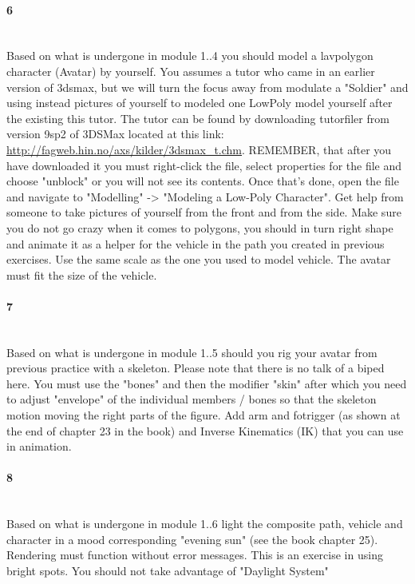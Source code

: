 \paragraph{ 6} ~\\
Based on what is undergone in module 1..4 you should model a lavpolygon character (Avatar) by yourself. 
You assumes a tutor who came in an earlier version of 3dsmax, but we will turn the focus away from modulate a "Soldier" and using instead pictures of yourself 
to modeled one LowPoly model yourself after the existing this tutor. 
The tutor can be found by downloading tutorfiler from version 9sp2 of 3DSMax located at this link: \url{http://fagweb.hin.no/axs/kilder/3dsmax_t.chm}. 
REMEMBER, that after you have downloaded it you must right-click the file, select properties for the file and choose "unblock" or you will not see its contents. 
Once that's done, open the file and navigate to "Modelling" -> "Modeling a Low-Poly Character". 
Get help from someone to take pictures of yourself from the front and from the side. 
Make sure you do not go crazy when it comes to polygons, you should in turn right shape and animate it as a helper for the vehicle in the path you created in previous exercises. 
Use the same scale as the one you used to model vehicle. 
The avatar must fit the size of the vehicle.

\paragraph{ 7} ~\\
Based on what is undergone in module 1..5 should you rig your avatar from previous practice with a skeleton. 
Please note that there is no talk of a biped here. 
You must use the "bones" and then the modifier "skin" after which you need to adjust "envelope" of the individual members / bones 
so that the skeleton motion moving the right parts of the figure. 
Add arm and fotrigger (as shown at the end of chapter 23 in the book) and Inverse Kinematics (IK) that you can use in animation.

\paragraph{ 8} ~\\
Based on what is undergone in module 1..6 light the composite path, vehicle and character in a mood corresponding "evening sun" (see the book chapter 25). 
Rendering must function without error messages. This is an exercise in using bright spots. 
You should not take advantage of "Daylight System"
